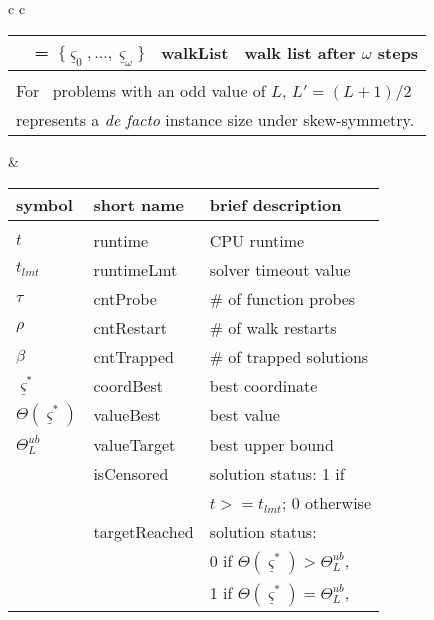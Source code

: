 \begin{table*}[t]
\begin{tabular}[]{c c}
\begin{tabular}[t]{l l l}
~~=~$\{{\underline \varsigma}_0, \dots , {\underline \varsigma}_\omega\}$ 
& walkList & walk list after $\omega$ steps \\[3.50ex]
\hline
\multicolumn{3}{l}{ }  \\[-1.0ex]
\multicolumn{3}{l}{For \labs\ problems with an odd value of $L$, $L' = (L+1)/2 $}  \\ 
\multicolumn{3}{l}{represents a {\em de facto} instance size under skew-symmetry.}  \\ 
\end{tabular}
&%
\begin{tabular}[t]{ l l l} 
\centering
\bf{symbol}  & \bf{short name} & \bf{brief description} \\ \hline\\[-1.25ex]
$t$ & runtime & CPU runtime  \\[0.35ex]  
$t_{lmt}$ & runtimeLmt & solver timeout value\\[0.35ex]  
$\tau$ & cntProbe & \# of function probes \\[0.35ex] %
$\rho$ & cntRestart & \# of walk restarts  \\[0.35ex]  
$ \beta $ & cntTrapped & \# of trapped solutions \\[0.75ex]  
${\underline \varsigma}^*$ & coordBest & best coordinate \\[0.75ex]
$\Theta({\underline \varsigma}^*)$ & valueBest & best value \\[0.75ex]
$\Theta^{ub}_L$ & valueTarget & best upper bound\\[1.05ex]  
~~                 & isCensored & solution status: 1 if\\
~~                 & ~~         & $t >= t_{lmt}$; 0 otherwise\\[0.5ex]
~~                 & targetReached & solution status:  \\
~~                 & ~~         & 0 if $\Theta({\underline \varsigma}^*) > \Theta^{ub}_L$,\\[0.5ex]
~~                 & ~~         & 1 if $\Theta({\underline \varsigma}^*) = \Theta^{ub}_L$,\\[0.5ex]

\end{tabular}
\end{tabular}
\end{table*}
